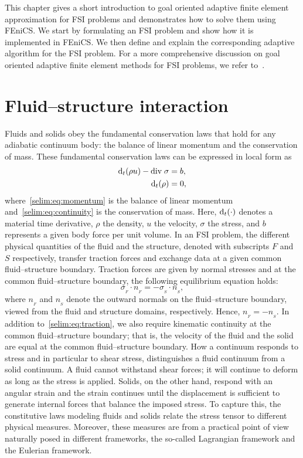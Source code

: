 This chapter gives a short introduction to goal oriented adaptive
finite element approximation for FSI problems and demonstrates how to
solve them using FEniCS. We start by formulating an FSI problem and
show how it is implemented in FEniCS. We then define and explain the
corresponding adaptive algorithm for the FSI problem. For a more
comprehensive discussion on goal oriented adaptive finite element
methods for FSI problems, we refer
to~\citet{SelimLogg2011a,Dunne2007,Dunne2006,
GratschBathe2006,BengzonLarson2010,ZeeBrummelenBorst2008a, Van2009}.
\section{Fluid--structure interaction}
\label{selim:sec:fsi}

Fluids and solids obey the fundamental conservation laws that hold
for any adiabatic continuum body: the balance of linear momentum and
the conservation of mass.  These fundamental conservation laws can be
expressed in local form as
\begin{align}
\label{selim:eq:momentum}
\textrm{d}_t(\rho u) - \textrm{div}\; \sigma &= b,
\\
\label{selim:eq:continuity}
\textrm{d}_t(\rho )  &= 0,
\end{align}
where~\eqref{selim:eq:momentum} is the balance of linear momentum
and~\eqref{selim:eq:continuity} is the conservation of mass.  Here,
$\textrm{d}_t(\cdot)$ denotes a material time derivative, $\rho$ the density,
$u$ the velocity, $\sigma$ the stress, and $b$ represents a given body
force per unit volume. In an FSI problem, the different physical
quantities of the fluid and the structure, denoted with subscripts
$F$ and $S$ respectively, transfer traction forces and exchange data
at a given common fluid--structure boundary.  Traction forces are
given by normal stresses and at the common fluid--structure boundary,
the following equilibrium equation holds:
\begin{equation}
\label{selim:eq:traction}
\sigma_{_{F}}\cdot n_{_{F}} =  - \sigma_{_{S}}\cdot n_{_{S}},
\end{equation}
where $n_{_{F}}$ and $n_{_{S}}$ denote the outward normals on the
fluid--structure boundary, viewed from the fluid and structure
domains, respectively. Hence, $n_{_{F}} = - n_{_{S}}$. In addition to~\eqref{selim:eq:traction}, we also require kinematic
continuity at the common fluid--structure boundary; that is, the
velocity of the fluid and the solid are equal at the common
fluid--structure boundary. How a continuum
responds to stress and in particular to shear stress, distinguishes a
fluid continuum from a solid continuum. A fluid cannot withstand shear
forces; it will continue to deform as long as the stress is
applied. Solids, on the other hand, respond with an angular strain and
the strain continues until the displacement is sufficient to generate
internal forces that balance the imposed stress. To capture this, the
constitutive laws modeling fluids and solids relate the stress tensor
to different physical measures. Moreover, these measures are from a
practical point of view naturally posed in different frameworks, the
so-called Lagrangian framework and the Eulerian framework.

